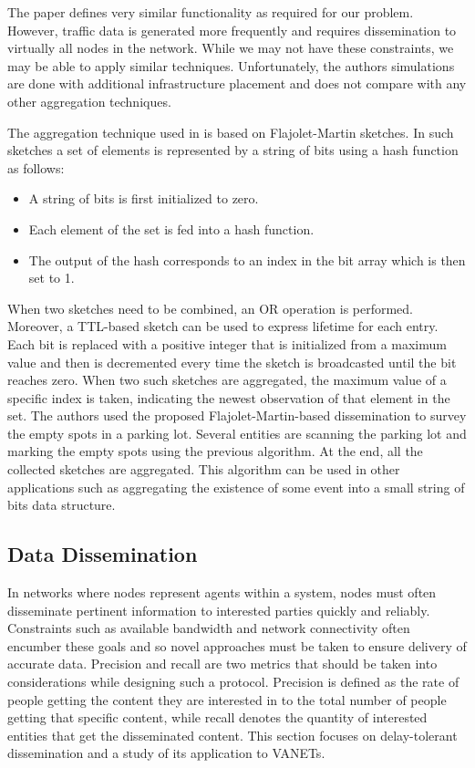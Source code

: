 \documentclass{IEEEtran}
\begin{document}
The \cite{landmark} paper defines very similar functionality as required for our problem. However, traffic data is generated more frequently and requires dissemination to virtually all nodes in the network. While we may not have these constraints, we may be able to apply similar techniques. Unfortunately, the authors simulations are done with additional infrastructure placement and does not compare with any other aggregation techniques.

The aggregation technique used in \cite{prob_agg} is based on Flajolet-Martin sketches. In such sketches a set of elements is represented by a string of bits using a hash function as follows:

\begin{itemize}
\item A string of bits is first initialized to zero.
\item Each element of the set is fed into a hash function.
\item The output of the hash corresponds to an index in the bit array which is then set to 1.
\end{itemize}

When two sketches need to be combined, an OR operation is performed. Moreover, a TTL-based sketch can be used to express lifetime for each entry. Each bit is replaced with a positive integer that is initialized from a maximum value and then is decremented every time the sketch is broadcasted until the bit reaches zero. When two such sketches are aggregated, the maximum value of a specific index is taken, indicating the newest observation of that element in the set.
The authors used the proposed Flajolet-Martin-based dissemination to survey the empty spots in a parking lot. Several entities are scanning the parking lot and marking the empty spots using the previous algorithm. At the end, all the collected sketches are aggregated. This algorithm can be used in other applications such as aggregating the existence of some event into a small string of bits data structure.

\subsection{Data Dissemination}

In networks where nodes represent agents within a system, nodes must often disseminate pertinent information to interested parties quickly and reliably.  Constraints such as available bandwidth and network connectivity often encumber these goals and so novel approaches must be taken to ensure delivery of accurate data.
Precision and recall are two metrics that should be taken into considerations while designing such a protocol. Precision is defined as the rate of people getting the content they are interested in to the total number of people getting that specific content, while recall denotes the quantity of interested entities that get the disseminated content.  This section focuses on delay-tolerant dissemination and a study of its application to VANETs.
\end{document}
